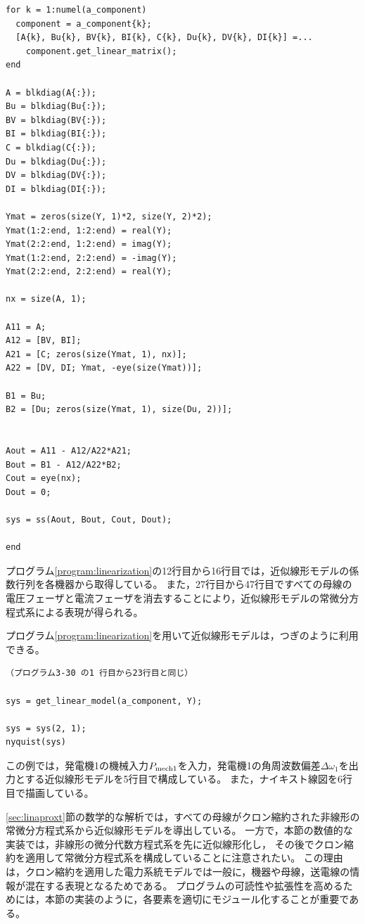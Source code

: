 \documentclass[tombow,dvipdfmx]{corona-a5-1.1}
\begin{document}
\begin{例}[近似線形モデルの実装]
\begin{PROGRAMA}[count,title={get\_linear\_model.m}]
\begin{verbatim}
for k = 1:numel(a_component)
  component = a_component{k};
  [A{k}, Bu{k}, BV{k}, BI{k}, C{k}, Du{k}, DV{k}, DI{k}] =...
    component.get_linear_matrix();
end

A = blkdiag(A{:});
Bu = blkdiag(Bu{:});
BV = blkdiag(BV{:});
BI = blkdiag(BI{:});
C = blkdiag(C{:});
Du = blkdiag(Du{:});
DV = blkdiag(DV{:});
DI = blkdiag(DI{:});

Ymat = zeros(size(Y, 1)*2, size(Y, 2)*2);
Ymat(1:2:end, 1:2:end) = real(Y);
Ymat(2:2:end, 1:2:end) = imag(Y);
Ymat(1:2:end, 2:2:end) = -imag(Y);
Ymat(2:2:end, 2:2:end) = real(Y);

nx = size(A, 1);

A11 = A;
A12 = [BV, BI];
A21 = [C; zeros(size(Ymat, 1), nx)];
A22 = [DV, DI; Ymat, -eye(size(Ymat))];

B1 = Bu;
B2 = [Du; zeros(size(Ymat, 1), size(Du, 2))];


Aout = A11 - A12/A22*A21;
Bout = B1 - A12/A22*B2;
Cout = eye(nx);
Dout = 0;

sys = ss(Aout, Bout, Cout, Dout);

end
\end{verbatim}
\end{PROGRAMA}

プログラム\ref{program:linearization}の12行目から16行目では，近似線形モデルの係数行列を各機器から取得している。
また，27行目から47行目ですべての母線の電圧フェーザと電流フェーザを消去することにより，近似線形モデルの常微分方程式系による表現が得られる。

プログラム\ref{program:linearization}を用いて近似線形モデルは，つぎのように利用できる。

\smallskip
\begin{PROGRAMA}[count,title={main\_linearization.m}]\label{program:main_linearization}
\begin{verbatim}
（プログラム3-30 の1 行目から23行目と同じ）

sys = get_linear_model(a_component, Y);

sys = sys(2, 1);
nyquist(sys)
\end{verbatim}
\end{PROGRAMA}

この例では，発電機1の機械入力$P_{{\rm mech}1}$を入力，発電機1の角周波数偏差$\Delta\omega_1$を出力とする近似線形モデルを5行目で構成している。
また，ナイキスト線図を6行目で描画している。
\end{例}

\ref{sec:linaproxt}節の数学的な解析では，すべての母線がクロン縮約された非線形の常微分方程式系から近似線形モデルを導出している。
一方で，本節の数値的な実装では，非線形の微分代数方程式系を先に近似線形化し，
その後でクロン縮約を適用して常微分方程式系を構成していることに注意されたい。
この理由は，クロン縮約を適用した電力系統モデルでは一般に，機器や母線，送電線の情報が混在する表現となるためである。
プログラムの可読性や拡張性を高めるためには，本節の実装のように，各要素を適切にモジュール化することが重要である。
\end{document}
